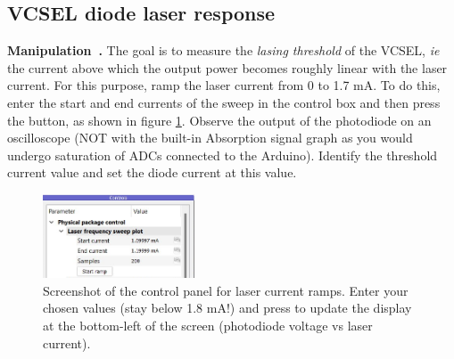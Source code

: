 \documentclass[a4paper,11pt]{article}
\newcounter{manip}
\newenvironment{manip}[1][]{\refstepcounter{manip}\par\medskip
	\textbf{Manipulation~\themanip. #1} \rmfamily }{\medskip}
\begin{document}
\subsection{VCSEL diode laser response}
\begin{manip}
The goal is to measure the \emph{lasing threshold} of the VCSEL, \textit{ie} the current above which the output power becomes roughly linear with the laser current. For this purpose, ramp the laser current from 0 to 1.7 mA. To do this, enter the start and end currents of the sweep in the control box and then press the  button, as shown in figure \ref{fig:ramp}. 
Observe the output of the photodiode on an oscilloscope (NOT with the built-in \textsf{Absorption signal} graph as you would undergo saturation of ADCs connected to the Arduino).
Identify the threshold current value and set the diode current at this value.
\end{manip}

\begin{figure}[!h] %
\centering
\includegraphics[width=0.4\textwidth]{Images/ramp_parameters.png}
\caption{Screenshot of the control panel for laser current ramps. Enter your chosen values (stay below 1.8 mA!) and press  to update the display at the bottom-left of the screen (photodiode voltage vs laser current).}
\label{fig:ramp}
\end{figure}
    
\end{document}
